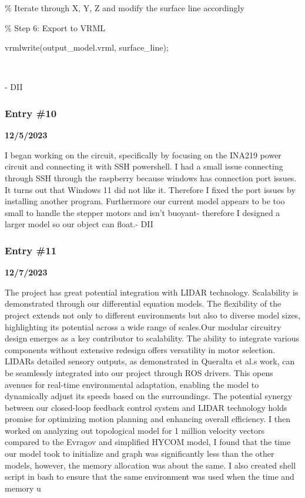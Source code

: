 \% Iterate through X, Y, Z and modify the surface line accordingly

\% Step 6: Export to VRML

vrmlwrite(\textquotesingle output\_model.vrml\textquotesingle,
surface\_line);



- DII

\subsubsection{Entry \#10}\label{entry-10}

\textbf{12/5/2023}

I began working on the circuit, specifically by focusing on the INA219
power circuit and connecting it with SSH powershell. I had a small issue
connecting through SSH through the raspberry because windows has
connection port issues. It turns out that Windows 11 did not like it.
Therefore I fixed the port issues by installing another program.
Furthermore our current model appears to be too small to handle the
stepper motors and isn't buoyant- therefore I designed a larger model so
our object can float.- DII

\subsubsection{\texorpdfstring{\hfill\break
}{ }}\label{section-10}

\subsubsection{Entry \#11}\label{entry-11}

\textbf{12/7/2023}

The project has great potential integration with LIDAR technology.
Scalability is demonstrated through our differential equation models.
The flexibility of the project extends not only to different
environments but also to diverse model sizes, highlighting its potential
across a wide range of scales.Our modular circuitry design emerges as a
key contributor to scalability. The ability to integrate various
components without extensive redesign offers versatility in motor
selection. LIDAR\textquotesingle s detailed sensory outputs, as
demonstrated in Queralta et al.\textquotesingle s work, can be
seamlessly integrated into our project through ROS drivers. This opens
avenues for real-time environmental adaptation, enabling the model to
dynamically adjust its speeds based on the surroundings. The potential
synergy between our closed-loop feedback control system and LIDAR
technology holds promise for optimizing motion planning and enhancing
overall efficiency. I then worked on analyzing out topological model for
1 million velocity vectors compared to the Evragov and simplified HYCOM
model, I found that the time our model took to initialize and graph was
significantly less than the other models, however, the memory allocation
was about the same. I also created shell script in bash to ensure that
the same environment was used when the time and memory u

